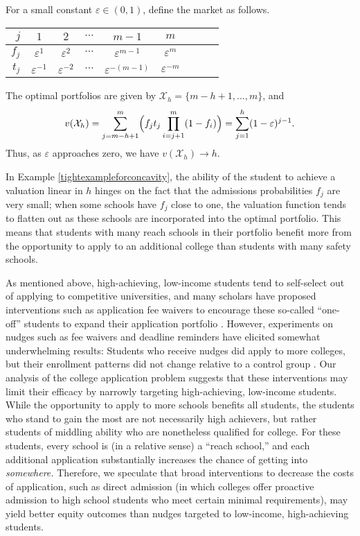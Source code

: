 \begin{example} \label{tightexampleforconcavity}
For a small constant $\varepsilon \in (0, 1)$, define the market as follows.
\begin{center}
\begin{tabular}{r|cccccccc}
$j$   & $1$ & $2$ & $\cdots$ & $m-1$ & $m$ \\ \hline
$f_j$ & $\varepsilon^{1}$ & $\varepsilon^{2}$ & $\cdots$ & $\varepsilon^{m-1}$ & $\varepsilon^{m}$ \\
$t_j$ & $\varepsilon^{-1}$ & $\varepsilon^{-2}$ & $\cdots$ & $\varepsilon^{-(m-1)}$ & $\varepsilon^{-m}$
\end{tabular}%
\end{center}
The optimal portfolios are given by $\mathcal{X}_h = \{m-h + 1, \dots, m\}$, and 
\begin{equation*}
v(\mathcal{X}_h) = \sum_{j= m-h +1}^m \Bigl( f_j t_j \prod_{i = j+1}^m (1 - f_{i}) \Bigr) =  \sum_{j= 1}^h  (1 - \varepsilon)^{j-1}.
\end{equation*}
Thus, as $\varepsilon$ approaches zero, we have $v(\mathcal{X}_h) \to h$.
\end{example}

In Example \ref{tightexampleforconcavity}, the ability of the student to achieve a valuation linear in $h$ hinges on the fact that the admissions probabilities $f_j$ are very small; when some schools have $f_j$ close to one, the valuation function tends to flatten out as these schools are incorporated into the optimal portfolio. This means that students with many reach schools in their portfolio benefit more from the opportunity to apply to an additional college than students with many safety schools.

As mentioned above, high-achieving, low-income students tend to self-select out of applying to competitive universities, and many scholars have proposed interventions such as application fee waivers to encourage these so-called  ``one-off'' students to expand their application portfolio \cite{hoxbyandavery2012,hoxbyandturner2013}. However, experiments on nudges such as fee waivers and deadline reminders have elicited somewhat underwhelming results: Students who receive nudges did apply to more colleges, but their enrollment patterns did not change relative to a control group \cite{gurantzetal2021}. Our analysis of the college application problem suggests that these interventions may limit their efficacy by narrowly targeting high-achieving, low-income students. While the opportunity to apply to more schools benefits all students, the students who stand to gain the most are not necessarily high achievers, but rather students of middling ability who are nonetheless qualified for college. For these students, every school is (in a relative sense) a ``reach school,'' and each additional application substantially increases the chance of getting into \emph{somewhere.} Therefore, we speculate that broad interventions to decrease the costs of application, such as direct admission \cite{jaschik2022} (in which colleges offer proactive admission to high school students who meet certain minimal requirements), may yield better equity outcomes than nudges targeted to low-income, high-achieving students.

